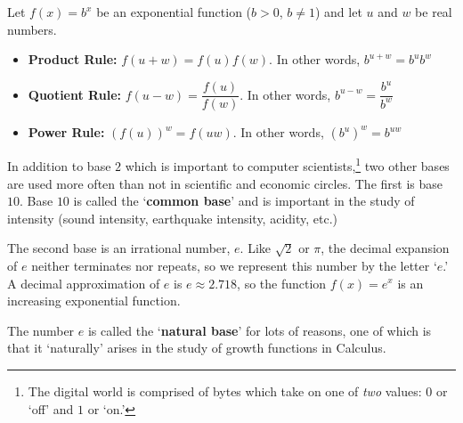 \smallskip

\colorbox{ResultColor}{\bbm

\begin{thm} \label{algpropexpfcns}
Let $f(x) = b^{x}$ be an exponential function ($b > 0$, $b\neq 1$) and let $u$ and $w$ be real numbers. 

\begin{itemize}

\item  \textbf{Product Rule:}  $f(u+w) = f(u) f(w)$.  In other words, $b^{u+w} = b^{u} b^{w}$

\item  \textbf{Quotient Rule:}  $f(u-w) = \dfrac{f(u)}{f(w)}$.  In other words, $b^{u-w} = \dfrac{b^{u}}{b^{w}}$

\item  \textbf{Power Rule:}  $\left(f(u)\right)^w = f(uw)$.  In other words, $\left(b^{u}\right)^{w} = b^{uw}$

\end{itemize}

\end{thm}

\ebm}

\smallskip

In addition to base $2$ which is important to computer scientists,\footnote{The digital world is comprised of bytes which take on one of \textit{two} values: $0$ or `off' and $1$ or `on.'} two other bases are used more often than not in scientific and economic circles.  The first is base  $10$.  Base $10$ is called the `\textbf{common base}' and is important in the study of intensity (sound intensity, earthquake intensity, acidity, etc.)   

\smallskip


The second base is an irrational number, $e$.  Like $\sqrt{2}$ or $\pi$, the decimal expansion of $e$ neither terminates nor repeats, so we represent this number by the letter `$e$.'  A decimal approximation of $e$ is $e \approx 2.718$, so the function $f(x) = e^{x}$ is an increasing exponential function.   

\smallskip

The number $e$ is called the `\textbf{natural base}' for lots of reasons, one of which is that it `naturally' arises in the study of growth functions in Calculus.  

